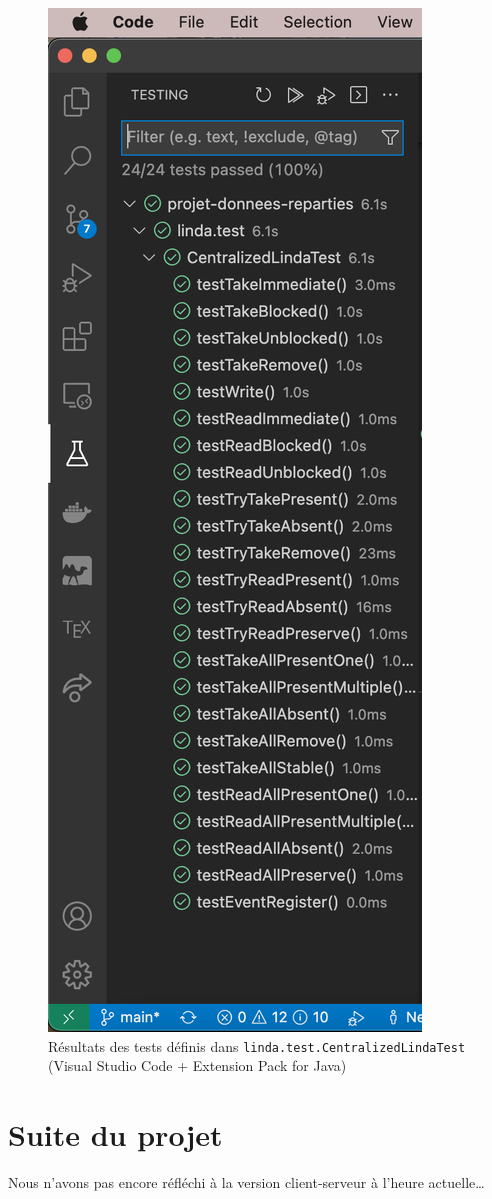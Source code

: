 \documentclass[headings=standardclasses,parskip=half]{scrartcl}
\begin{document}
\begin{figure}[h]
    \centering
    \includegraphics[scale=0.5]{tests-results.png}
    \caption{Résultats des tests définis dans
        \texttt{linda.test.CentralizedLindaTest}\\
        (Visual Studio Code + Extension Pack for Java)}
\end{figure}

\section*{Suite du projet}

Nous n'avons pas encore réfléchi à la version
client-serveur à l'heure actuelle\dots
\end{document}
